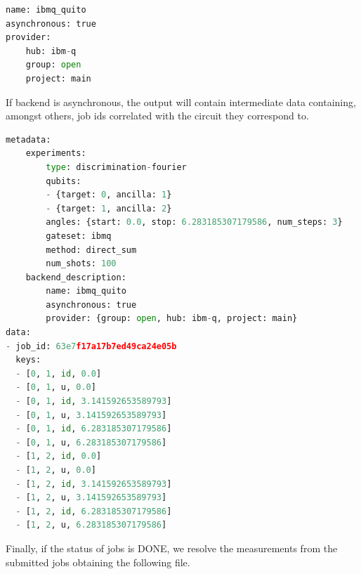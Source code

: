 \documentclass[preprint,12pt, a4paper, dvipsnames]{elsarticle}
\newcommand{\1}{{\rm 1\hspace{-0.9mm}l}}
\theoremstyle{definition}
\begin{document}
\begin{lstlisting}[language=Python, caption=Backend file]
name: ibmq_quito
asynchronous: true
provider:
	hub: ibm-q
	group: open
	project: main

\end{lstlisting}
If backend is asynchronous, the output will contain intermediate data
containing, amongst others, job ids correlated with the circuit they
correspond to.

\begin{lstlisting}[language=Python, caption=Resolved results]
metadata:
	experiments:
		type: discrimination-fourier
		qubits:
		- {target: 0, ancilla: 1}
		- {target: 1, ancilla: 2}
		angles: {start: 0.0, stop: 6.283185307179586, num_steps: 3}
		gateset: ibmq
		method: direct_sum
		num_shots: 100
	backend_description:
		name: ibmq_quito
		asynchronous: true
		provider: {group: open, hub: ibm-q, project: main}
data:
- job_id: 63e7f17a17b7ed49ca24e05b
  keys:
  - [0, 1, id, 0.0]
  - [0, 1, u, 0.0]
  - [0, 1, id, 3.141592653589793]
  - [0, 1, u, 3.141592653589793]
  - [0, 1, id, 6.283185307179586]
  - [0, 1, u, 6.283185307179586]
  - [1, 2, id, 0.0]
  - [1, 2, u, 0.0]
  - [1, 2, id, 3.141592653589793]
  - [1, 2, u, 3.141592653589793]
  - [1, 2, id, 6.283185307179586]
  - [1, 2, u, 6.283185307179586]

\end{lstlisting}
Finally, if the status of jobs is DONE, we resolve the measurements from the
submitted jobs obtaining the following file.
\end{document}
